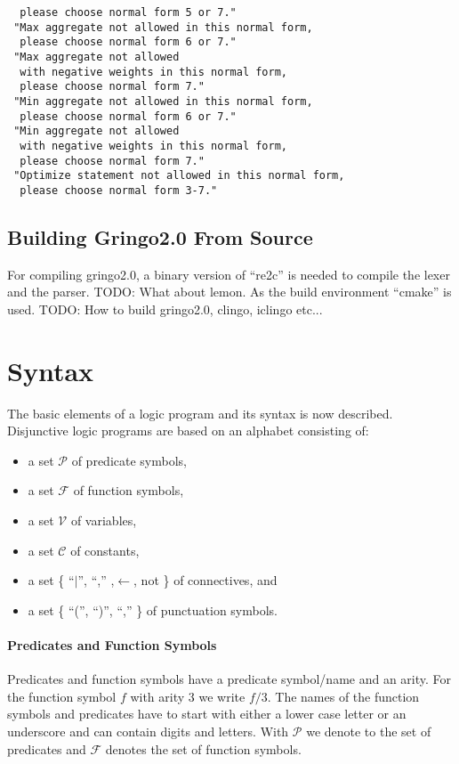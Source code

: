 \documentclass[a4paper,10pt]{article}
\begin{document}
\begin{itemize}
\begin{verbatim}
  please choose normal form 5 or 7."
 "Max aggregate not allowed in this normal form,
  please choose normal form 6 or 7."
 "Max aggregate not allowed
  with negative weights in this normal form,
  please choose normal form 7."
 "Min aggregate not allowed in this normal form,
  please choose normal form 6 or 7."
 "Min aggregate not allowed 
  with negative weights in this normal form,
  please choose normal form 7."
 "Optimize statement not allowed in this normal form,
  please choose normal form 3-7."
\end{verbatim}
\end{itemize}


\subsection{Building Gringo2.0 From Source}
For compiling gringo2.0, a binary version of ``re2c'' is needed to compile the lexer and the parser.
TODO: What about lemon.
As the build environment ``cmake'' is used.
TODO: How to build gringo2.0, clingo, iclingo etc...

\section{Syntax}
The basic elements of a logic program and its syntax is now described.
Disjunctive logic programs are based on an alphabet \cite{syntax} consisting of:
\begin{itemize}
\item a set $\mathcal{P}$ of predicate symbols,
\item a set $\mathcal{F}$ of function symbols,
\item a set $\mathcal{V}$ of variables,
\item a set $\mathcal{C}$ of constants,
\item a set \{ ``$\mid$'', ``,'' ,$\leftarrow$, not \} of connectives, and
\item a set \{ ``('', ``)'', ``,'' \} of punctuation symbols.
\end{itemize}

\paragraph{Predicates and Function Symbols}
Predicates and function symbols have a predicate symbol/name and an arity.
For the function symbol $f$ with arity 3 we write $f/3$.
The names of the function symbols and predicates have to start with either a lower case letter or an underscore and can contain digits and letters.
With $\mathcal{P}$ we denote to the set of predicates and $\mathcal{F}$ denotes the set of function symbols.
\end{document}
